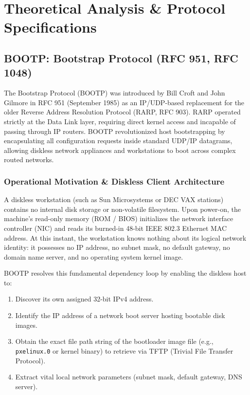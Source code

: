 \documentclass[12pt, a4paper]{article}
\begin{document}
\section{Theoretical Analysis \& Protocol Specifications}

\subsection{BOOTP: Bootstrap Protocol (RFC 951, RFC 1048)}
The Bootstrap Protocol (BOOTP) was introduced by Bill Croft and John Gilmore in RFC 951 (September 1985) as an IP/UDP-based replacement for the older Reverse Address Resolution Protocol (RARP, RFC 903). RARP operated strictly at the Data Link layer, requiring direct kernel access and incapable of passing through IP routers. BOOTP revolutionized host bootstrapping by encapsulating all configuration requests inside standard UDP/IP datagrams, allowing diskless network appliances and workstations to boot across complex routed networks.

\subsubsection{Operational Motivation \& Diskless Client Architecture}
A diskless workstation (such as Sun Microsystems or DEC VAX stations) contains no internal disk storage or non-volatile filesystem. Upon power-on, the machine's read-only memory (ROM / BIOS) initializes the network interface controller (NIC) and reads its burned-in 48-bit IEEE 802.3 Ethernet MAC address. At this instant, the workstation knows nothing about its logical network identity: it possesses no IP address, no subnet mask, no default gateway, no domain name server, and no operating system kernel image. 

BOOTP resolves this fundamental dependency loop by enabling the diskless host to:
\begin{enumerate}
    \item Discover its own assigned 32-bit IPv4 address.
    \item Identify the IP address of a network boot server hosting bootable disk images.
    \item Obtain the exact file path string of the bootloader image file (e.g., \texttt{pxelinux.0} or kernel binary) to retrieve via TFTP (Trivial File Transfer Protocol).
    \item Extract vital local network parameters (subnet mask, default gateway, DNS server).
\end{enumerate}
\end{document}
